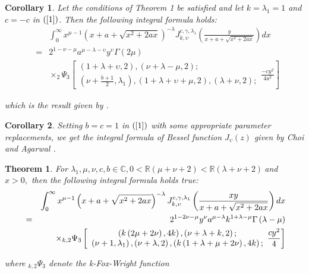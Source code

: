 \documentclass{amsart}
\newtheorem{theorem}{Theorem}
\theoremstyle{plain}
\newtheorem{corollary}{Corollary}
\numberwithin{equation}{section}
\begin{document}
\begin{corollary}
Let the conditions of Theorem 1 be satisfied and let $k=\lambda _{1}=1$ and $c=-c$ in $\left( \ref{1}\right) $. Then the following integral formula holds:\begin{eqnarray*}
&&\int_{0}^{\infty }x^{\mu -1}\left( x+a+\sqrt{x^{2}+2ax}\right) ^{-\lambda
}J_{k,\upsilon }^{c,\gamma ,\lambda _{1}}\left( \frac{y}{x+a+\sqrt{x^{2}+2ax}}\right) dx \\
&=&2^{1-\nu -\mu }a^{\mu -\lambda -\upsilon }y^{\upsilon }\Gamma \left( 2\mu
\right)  \\
&&\times _{2}\Psi _{3}\left[ 
\begin{array}{c}
\left( 1+\lambda +\upsilon ,2\right) ,(\nu +\lambda -\mu ,2); \\ 
\left( \nu +\frac{b+1}{2},\lambda _{1}\right) ,\left( 1+\lambda +\upsilon
+\mu ,2\right) ,\left( \lambda +\nu ,2\right) ;\end{array}\frac{-cy^{2}}{4a^{2}}\right] 
\end{eqnarray*}

which is the result given by \cite{Choi-Mathur} .
\end{corollary}

\begin{corollary}
Setting $b=c=1$ in $\left( \ref{1}\right) $ with some appropriate parameter
replacements, we get the integral formula of Bessel function $J_{\upsilon
}\left( z\right) $ given by Choi and Agarwal \cite{Choi2}.
\end{corollary}

\begin{theorem}
For $\lambda _{1},\mu ,\nu ,c,b\in \mathbb{C},0<\mathbb{R}\left( \mu +\nu
+2\right) <\mathbb{R}\left( \lambda +\nu +2\right) ~$and $x>0,$ then the
following integral formula holds true:\begin{eqnarray}
&&\int_{0}^{\infty }x^{\mu -1}\left( x+a+\sqrt{x^{2}+2ax}\right) ^{-\lambda
}J_{k,\upsilon }^{c,\gamma ,\lambda _{1}}\left( \frac{xy}{x+a+\sqrt{x^{2}+2ax}}\right) dx  \notag \\
&=&2^{1-2\nu -\mu }y^{\nu }a^{\mu -\lambda }k^{1+\lambda -\mu }\Gamma \left(
\lambda -\mu \right)  \notag \\
&&\times _{k,2}\Psi _{3}\left[ 
\begin{array}{c}
\left( k\left( 2\mu +2\nu \right) ,4k\right) ,\left( \nu +\lambda
+k,2\right) ; \\ 
\left( \nu +1,\lambda _{1}\right) ,\left( \nu +\lambda ,2\right) ,\left(
k\left( 1+\lambda +\mu +2\nu \right) ,4k\right) ;\end{array}\frac{cy^{2}}{4}\right]  \label{2}
\end{eqnarray}

where $_{k,2}\Psi _{3}$ denote the k-Fox-Wright function \cite{Cerutti}
\end{theorem}
\end{document}
